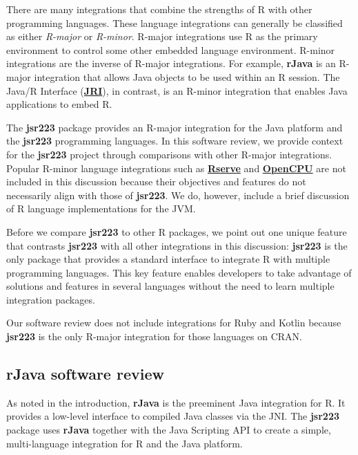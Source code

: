 \documentclass[
article,
11pt, %
a4paper, %
oneside, %
headinclude,footinclude, %
]{scrartcl}
\theoremstyle{definition} %
\theoremstyle{plain} %
\theoremstyle{remark} %
\newcommand{\pkg}[1]{\textbf{#1}}
\newcommand{\CRANpkg}[1]{\href{https://CRAN.R-project.org/package=#1}{\pkg{#1}}}
\newcommand{\dfn}[1]{{\normalfont\textsl{#1}}}
\begin{document}
There are many integrations that combine the strengths of R with other programming languages. These language integrations can generally be classified as either \dfn{R-major} or \dfn{R-minor}. R-major integrations use R as the primary environment to control some other embedded language environment. R-minor integrations are the inverse of R-major integrations. For example, \pkg{rJava} is an R-major integration that allows Java objects to be used within an R session. The Java/R Interface (\CRANpkg{JRI}), in contrast, is an R-minor integration that enables Java applications to embed R.

The \pkg{jsr223} package provides an R-major integration for the Java platform and the \pkg{jsr223} programming languages. In this software review, we provide context for the \pkg{jsr223} project through comparisons with other R-major integrations. Popular R-minor language integrations such as \CRANpkg{Rserve} \citep{rserve} and \CRANpkg{OpenCPU} \citep{opencpu} are not included in this discussion because their objectives and features do not necessarily align with those of \pkg{jsr223}. We do, however, include a brief discussion of R language implementations for the JVM.

Before we compare \pkg{jsr223} to other R packages, we point out one unique feature that contrasts \pkg{jsr223} with all other integrations in this discussion: \pkg{jsr223} is the only package that provides a standard interface to integrate R with multiple programming languages. This key feature enables developers to take advantage of solutions and features in several languages without the need to learn multiple integration packages.

Our software review does not include integrations for Ruby and Kotlin because \pkg{jsr223} is the only R-major integration for those languages on CRAN.

\hypertarget{rjava-software-review}{}
\subsection{\pkg{rJava} software review}

As noted in the introduction, \pkg{rJava} is the preeminent Java integration for R. It provides a low-level interface to compiled Java classes via the JNI. The \pkg{jsr223} package uses \pkg{rJava} together with the Java Scripting API to create a simple, multi-language integration for R and the Java platform.
\end{document}
